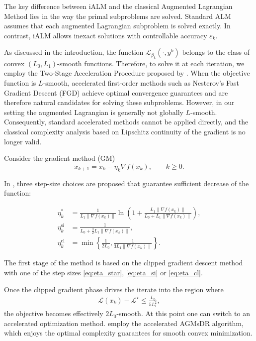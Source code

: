 \documentclass[runningheads]{llncs}
\begin{document}
	The key difference between iALM and the classical Augmented Lagrangian Method lies in the way the primal subproblems are solved. Standard ALM assumes that each augmented Lagrangian subproblem is solved exactly. In contrast, iALM allows inexact solutions with controllable accuracy $\varepsilon_k$. 
	
	As discussed in the introduction, the function $\mathcal{L}_{\beta_k}(\cdot,y^k)$ belongs to the class of convex $(L_0,L_1)$-smooth functions. Therefore, to solve it at each iteration, we employ the Two-Stage Acceleration Procedure proposed by \cite{vankov2025optimizing}. When the objective function is $L$-smooth, accelerated first-order methods such as Nesterov's Fast Gradient Descent (FGD) achieve optimal convergence guarantees and are therefore natural candidates for solving these subproblems. However, in our setting the augmented Lagrangian is generally not globally $L$-smooth. Consequently, standard accelerated methods cannot be applied directly, and the classical complexity analysis based on Lipschitz continuity of the gradient is no longer valid.
	
	Consider the gradient method (GM)
	\begin{equation}\label{eq:clipped_gm}
		x_{k+1}=x_k-\eta_k\nabla f(x_k),\qquad k\ge 0.
	\end{equation}
	
	In \cite{vankov2025optimizing}, three step-size choices are proposed that guarantee sufficient decrease of the function:
	
	\begin{align}
		\eta_k^* &= \frac{1}{L_1\|\nabla f(x_k)\|}\ln\!\left(1+\frac{L_1\|\nabla f(x_k)\|}{L_0+L_1\|\nabla f(x_k)\|}\right),\label{eq:eta_star}\\
		\eta_k^{\text{si}} &= \frac{1}{L_0+\frac32 L_1\|\nabla f(x_k)\|},\label{eq:eta_si}\\
		\eta_k^{\text{cl}} &= \min\left\{\frac{1}{2L_0},\frac{1}{3L_1\|\nabla f(x_k)\|}\right\}.\label{eq:eta_cl}
	\end{align}
	
	The first stage of the method is based on the clipped gradient descent method with one of the step sizes \eqref{eq:eta_star}, \eqref{eq:eta_si} or \eqref{eq:eta_cl}.
	
	Once the clipped gradient phase drives the iterate into the region where
	\begin{align}
		\mathcal{L}(x_k)-\mathcal{L}^\star \leq \frac{L_0}{5 L_1^2},
	\end{align}
	the objective becomes effectively $2L_0$-smooth. At this point one can switch to an accelerated optimization method. \cite{vankov2025optimizing} employ the accelerated AGMsDR algorithm, which enjoys the optimal complexity guarantees for smooth convex minimization.
	
\end{document}
